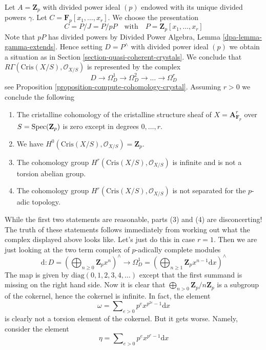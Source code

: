 \begin{example}
\label{example-affine-n-space}
Let $A = \mathbf{Z}_p$ with divided power ideal $(p)$ endowed with
its unique divided powers $\gamma$. Let
$C = \mathbf{F}_p[x_1, \ldots, x_r]$. We choose the presentation
$$
C = P/J = P/pP\quad\text{with}\quad P = \mathbf{Z}_p[x_1, \ldots, x_r]
$$
Note that $pP$ has divided powers by
Divided Power Algebra, Lemma \ref{dpa-lemma-gamma-extends}.
Hence setting $D = P^\wedge$ with divided power ideal $(p)$ we obtain a
situation as in Section \ref{section-quasi-coherent-crystals}.
We conclude that $R\Gamma(\text{Cris}(X/S), \mathcal{O}_{X/S})$
is represented by the complex
$$
D \to \Omega^1_D \to \Omega^2_D \to \ldots \to \Omega^r_D
$$
see Proposition \ref{proposition-compute-cohomology-crystal}.
Assuming $r > 0$ we conclude the following
\begin{enumerate}
\item The cristalline cohomology of the cristalline structure sheaf
of $X = \mathbf{A}^r_{\mathbf{F}_p}$ over $S = \mathop{\mathrm{Spec}}(\mathbf{Z}_p)$
is zero except in degrees $0, \ldots, r$.
\item We have $H^0(\text{Cris}(X/S), \mathcal{O}_{X/S}) = \mathbf{Z}_p$.
\item The cohomology group $H^r(\text{Cris}(X/S), \mathcal{O}_{X/S})$
is infinite and is not a torsion abelian group.
\item The cohomology group $H^r(\text{Cris}(X/S), \mathcal{O}_{X/S})$
is not separated for the $p$-adic topology.
\end{enumerate}
While the first two statements are reasonable, parts (3) and (4) are
disconcerting! The truth of these statements follows immediately from
working out what the complex displayed above looks like. Let's just do
this in case $r = 1$. Then we are just looking at the two term complex
of $p$-adically complete modules
$$
\text{d} :
D = \left(
\bigoplus\nolimits_{n \geq 0} \mathbf{Z}_p x^n
\right)^\wedge
\longrightarrow
\Omega^1_D = \left(
\bigoplus\nolimits_{n \geq 1} \mathbf{Z}_p x^{n - 1}\text{d}x
\right)^\wedge
$$
The map is given by $\text{diag}(0, 1, 2, 3, 4, \ldots)$ except that
the first summand is missing on the right hand side. Now it is clear
that $\bigoplus_{n > 0} \mathbf{Z}_p/n\mathbf{Z}_p$ is a subgroup
of the cokernel, hence the cokernel is infinite. In fact, the element
$$
\omega = \sum\nolimits_{e > 0} p^e x^{p^{2e} - 1}\text{d}x
$$
is clearly not a torsion element of the cokernel. But it gets worse.
Namely, consider the element
$$
\eta = \sum\nolimits_{e > 0} p^e x^{p^e - 1}\text{d}x
$$

\end{example}
